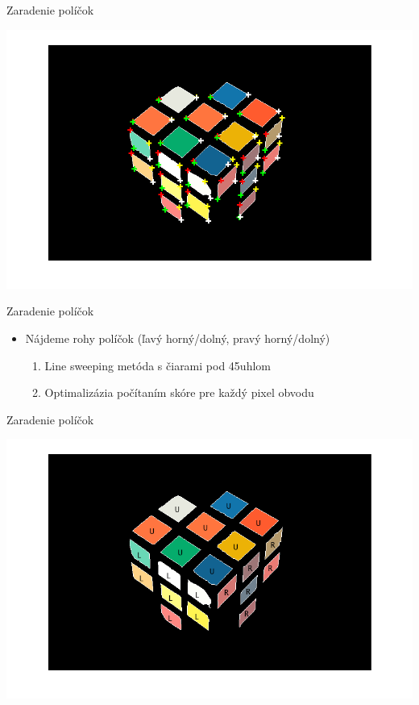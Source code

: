 \documentclass[red]{beamer}
\begin{document}
\begin{frame}{Zaradenie políčok}
\centerline{\includegraphics[width=\linewidth]{img/rohy}}
\end{frame}



\begin{frame}{Zaradenie políčok}
\begin{itemize}
\item Nájdeme rohy políčok (ľavý horný/dolný, pravý horný/dolný)
\begin{enumerate}[-]
\item Line sweeping metóda s čiarami pod 45\textdegree uhlom
\item Optimalizázia počítaním skóre pre každý pixel obvodu
\end{enumerate}
\end{itemize}
\pause
{}
\pause
{}
\end{frame}



\begin{frame}{Zaradenie políčok}
\centerline{\includegraphics[width=\linewidth]{img/strany}}
\end{frame}
\end{document}
